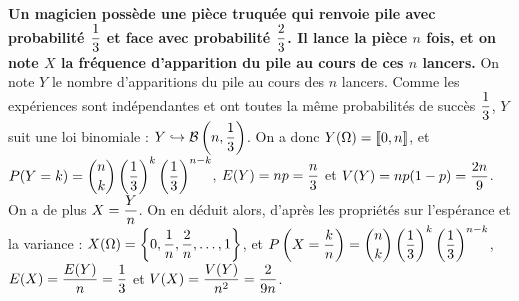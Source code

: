 \documentclass[a4paper, 11pt,reqno]{article}
\begin{document}
\begin{correction}
	\;
	\noindent \textbf{Un magicien poss\`ede une pi\`ece truqu\'ee qui renvoie pile avec probabilit\'e $\displaystyle \frac{1}{3}$ et face avec probabilit\'e $\displaystyle \frac{2}{3}$. Il lance la pi\`ece $n$ fois, et on note $X$ la fr\'equence d'apparition du pile au cours de ces $n$ lancers.}
		      On note $Y$ le nombre d'apparitions du pile au cours des $n$ lancers. Comme les exp\'eriences sont ind\'ependantes et ont toutes la m\^eme probabilit\'es de succ\`es $\displaystyle\frac{1}{3}$, $Y$ suit une loi binomiale : $Y \hookrightarrow \displaystyle\mathcal{B}\left(n,\frac{1}{3}\right)$. On a donc $Y(\Omega)=\llbracket 0,n\rrbracket$, et $P(Y=k) = \displaystyle\binom{n}{k} \left(\frac{1}{3}\right)^k \left(\frac{1}{3}\right)^{n-k}$, $E(Y)= n p = \displaystyle\frac{n}{3}$ et $V(Y) \displaystyle = n p (1-p) = \frac{2n}{9}$.\\
		      On a de plus $X=\displaystyle\frac{Y}{n}$. On en d\'eduit alors, d'apr\`es les propri\'et\'es sur l'esp\'erance et la variance : $X(\Omega)=\displaystyle \left\{0, \frac{1}{n}, \frac{2}{n}, \ldots ,1\right\}$, et $\displaystyle P\left(X=\frac{k}{n} \right) = \displaystyle\binom{n}{k} \left(\frac{1}{3}\right)^k \left(\frac{1}{3}\right)^{n-k}$, $E(X)= \displaystyle \frac{E(Y)}{n} = \frac{1}{3}$ et $V(X) \displaystyle = \frac{V(Y)}{n^2}= \frac{2}{9n}$.\\
\end{correction}
\end{document}
